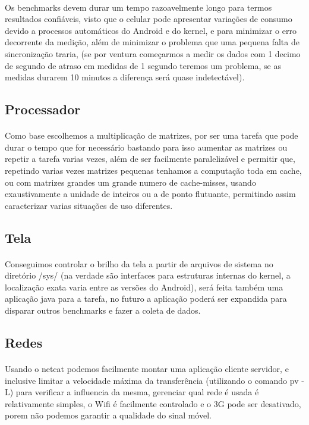 \documentclass[11pt,a4paper,titlepage]{article}
\begin{document}
\paragraph{} Os benchmarks devem durar um tempo razoavelmente longo para termos resultados confiáveis, visto que o celular pode apresentar variações de consumo devido a processos automáticos do Android e do kernel, e para minimizar o erro decorrente da medição, além de minimizar o problema que uma pequena falta de sincronização traria, (se por ventura começarmos a medir os dados com 1 decimo de segundo de atraso em medidas de 1 segundo teremos um problema, se as medidas durarem 10 minutos a diferença será quase indetectável).


\subsection{Processador}
\paragraph{} Como base escolhemos a multiplicação de matrizes, por ser uma tarefa que pode durar o tempo que for necessário bastando para isso aumentar as matrizes ou repetir a tarefa varias vezes, além de ser facilmente paralelizável e permitir que, repetindo varias vezes matrizes pequenas tenhamos a computação toda em cache, ou com matrizes grandes um grande numero de cache-misses, usando exaustivamente a unidade de inteiros ou a de ponto flutuante, permitindo assim caracterizar varias situações de uso diferentes.

\subsection{Tela}
\paragraph{} Conseguimos controlar o brilho da tela a partir de arquivos de sistema no diretório /sys/ (na verdade são interfaces para estruturas internas do kernel, a localização exata varia entre as versões do Android), será feita também uma aplicação java para a tarefa, no futuro a aplicação poderá ser expandida para disparar outros benchmarks e fazer a coleta de dados.
\subsection{Redes}
\paragraph{} Usando o netcat podemos facilmente montar uma aplicação cliente servidor, e inclusive limitar a velocidade máxima da transferência (utilizando o comando pv -L) para verificar a influencia da mesma, gerenciar qual rede é usada é relativamente simples, o Wifi é facilmente controlado e o 3G pode ser desativado, porem não podemos garantir a qualidade do sinal móvel.
\end{document}
